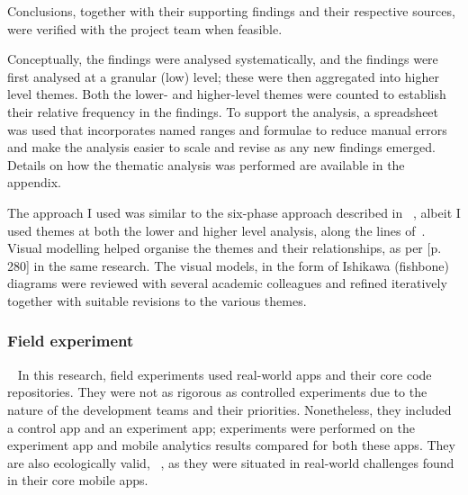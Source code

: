 Conclusions, together with their supporting findings and their respective sources, were verified with the project team when feasible. 

Conceptually, the findings were analysed systematically, and the findings were first analysed at a granular (low) level; these were then aggregated into higher level themes. Both the lower- and higher-level themes were counted to establish their relative frequency in the findings. 
To support the analysis, a spreadsheet was used that incorporates named ranges and formulae to reduce manual errors and make the analysis easier to scale and revise as any new findings emerged. Details on how the thematic analysis was performed are available in the \href{appendix-thematic-analysis}{} appendix.

The approach I used was similar to the six-phase approach described in ~, %
albeit I used themes at both the lower and higher level analysis, along the lines of~. Visual modelling helped organise the themes and their relationships, as per [p. 280] in the same research. The visual models, in the form of Ishikawa (fishbone) diagrams were reviewed with several academic colleagues and refined iteratively together with suitable revisions to the various themes.

\subsubsection{Field experiment}~\label{section-field-experiment-method}
In this research, field experiments used real-world apps and their core code repositories. They were not as rigorous as controlled experiments due to the nature of the development teams and their priorities. Nonetheless, they included a control app and an experiment app;  experiments were performed on the experiment app and mobile analytics results compared for both these apps. They are also ecologically valid, ~, as they were situated in real-world challenges found in their core mobile apps.

